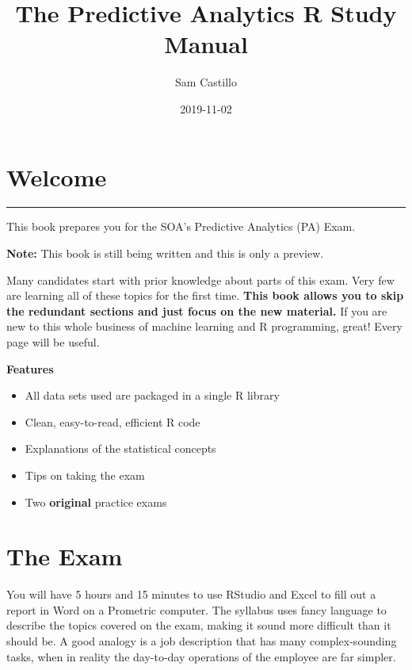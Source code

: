 \documentclass[]{book}
\title{The Predictive Analytics R Study Manual}
\author{Sam Castillo}
\date{2019-11-02}
\providecommand{\tightlist}{%
  \setlength{\itemsep}{0pt}\setlength{\parskip}{0pt}}
\begin{document}
\maketitle

{
\setcounter{tocdepth}{1}
\tableofcontents
}
\hypertarget{welcome}{%
\chapter{Welcome}\label{welcome}}

\begin{center}\rule{0.5\linewidth}{\linethickness}\end{center}

This book prepares you for the SOA's Predictive Analytics (PA) Exam.

\textbf{Note:} This book is still being written and this is only a preview.

Many candidates start with prior knowledge about parts of this exam. Very few are learning all of these topics for the first time. \textbf{This book allows you to skip the redundant sections and just focus on the new material.} If you are new to this whole business of machine learning and R programming, great! Every page will be useful.

\textbf{Features}

\begin{itemize}
\tightlist
\item
  All data sets used are packaged in a single R library
\item
  Clean, easy-to-read, efficient R code
\item
  Explanations of the statistical concepts
\item
  Tips on taking the exam
\item
  Two \textbf{original} practice exams
\end{itemize}

\hypertarget{the-exam}{%
\chapter{The Exam}\label{the-exam}}

You will have 5 hours and 15 minutes to use RStudio and Excel to fill out a report in Word on a Prometric computer. The syllabus uses fancy language to describe the topics covered on the exam, making it sound more difficult than it should be. A good analogy is a job description that has many complex-sounding tasks, when in reality the day-to-day operations of the employee are far simpler.
\end{document}
